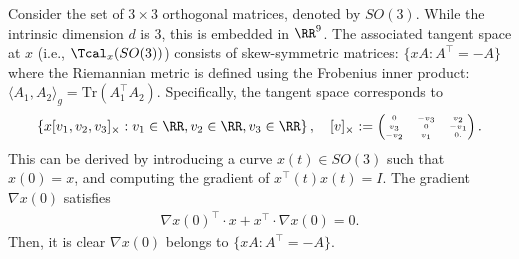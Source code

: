 \begin{Exabox}{}
\begin{example}[SO(3)]
Consider the set of $3 \times 3$ orthogonal matrices, denoted by $SO(3)$. While the intrinsic dimension $d$ is 3, this is embedded in $\RR^9$. The associated tangent space at $x$ (i.e., $\Tcal_{x}(SO(3))$) consists of skew-symmetric matrices: $\{xA:  A^{\top} = -A\}$ where the Riemannian metric is defined using the Frobenius inner product:
$\langle A_1,A_2\rangle_{g}= \mathrm{Tr}(A^{\top}_1 A_2).$ Specifically, the tangent space corresponds to 
\begin{align*}
    \left \{x[v_1, v_2, v_3 ]_{\times}: v_1 \in \RR, v_2 \in \RR, v_3 \in \RR \right\}, \quad [v]_{\times}\textstyle :=
    {\tiny
    \begin{pmatrix}
        0 & -v_3 & v_2 \\
        v_3 & 0 & -v_1 \\
        -v_2 & v_1 & 0. 
    \end{pmatrix}.  } 
\end{align*} 
This can be derived by introducing a curve $x(t) \in SO(3)$ such that $x(0)=x$, and computing the gradient of $x^{\top}(t)x(t)=I$. The gradient $\nabla x(0)$ satisfies 
\begin{align*}
    \nabla x(0)^{\top} \cdot x  +  x^{\top} \cdot \nabla x(0)=0. 
\end{align*}
Then, it is clear $\nabla x(0)$ belongs to $\{xA:  A^{\top} = -A\}$. 
\end{example}
\end{Exabox}

